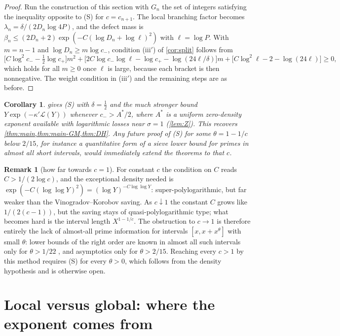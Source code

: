 \documentclass[11pt,a4paper]{article}
\newtheorem{corollary}[theorem]{Corollary}
\theoremstyle{definition}
\newtheorem{remark}[theorem]{Remark}
\begin{document}
\begin{proof}
Run the construction of this section with $G_n$ the set of integers satisfying the inequality opposite to (S)
for $c=c_{n+1}$. The local branching factor becomes $\lambda_n=\delta/(2D_n\log 4P)$, and the defect mass is
$\beta_n\le(2D_n+2)\exp(-C(\log D_n+\log\ell)^2)$ with $\ell=\log P$. With $m=n-1$ and $\log D_n\ge m\log c_-$,
condition (iii$'$) of \cref{cor:split} follows from
\[
 \bigl[C\log^2c_--\tfrac12\log c_+\bigr]m^2+\bigl[2C\log c_-\log\ell-\log c_+-\log(24\ell/\delta)\bigr]m
 +\bigl[C\log^2\ell-2-\log(24\ell)\bigr]\ge0,
\]
which holds for all $m\ge0$ once $\ell$ is large, because each bracket is then nonnegative. The weight
condition in (iii$'$) and the remaining steps are as before.
\end{proof}

\begin{corollary}\label{cor:transfer}
 gives (S) with $\delta=\tfrac12$ and the much stronger bound $Y\exp(-\kappa'\mathcal L(Y))$ whenever
$c_->A^*/2$, where $A^*$ is a uniform zero-density exponent available with logarithmic losses near $\sigma=1$
(\cref{lem:Z}). This recovers \cref{thm:main,thm:main-GM,thm:DH}. Any future proof of (S) for some
$\theta=1-1/c$ below $2/15$, for instance a quantitative form of a sieve lower bound for primes in almost all
short intervals, would immediately extend the theorems to that $c$.
\end{corollary}

\begin{remark}[how far towards $c=1$]\label{rem:towards1}
For constant $c$ the condition on $C$ reads $C>1/(2\log c)$, and the exceptional density needed is
$\exp(-C(\log\log Y)^2)=(\log Y)^{-C\log\log Y}$: super-polylogarithmic, but far weaker than the
Vinogradov--Korobov saving. As $c\downarrow1$ the constant $C$ grows like $1/(2(c-1))$, but the saving stays of
quasi-polylogarithmic type; what becomes hard is the interval length $X^{1-1/c}$. The obstruction to $c\to1$ is therefore entirely the lack of almost-all prime
information for intervals $[x,x+x^\theta]$ with small $\theta$: lower bounds of the right order are known in almost
all such intervals only for $\theta>1/22$ \cite{Li25b}, and asymptotics only for $\theta>2/15$. Reaching every
$c>1$ by this method requires (S) for every $\theta>0$, which follows from the density hypothesis and is
otherwise open.
\end{remark}

\section{Local versus global: where the exponent comes from}\label{sec:compare}
\end{document}
